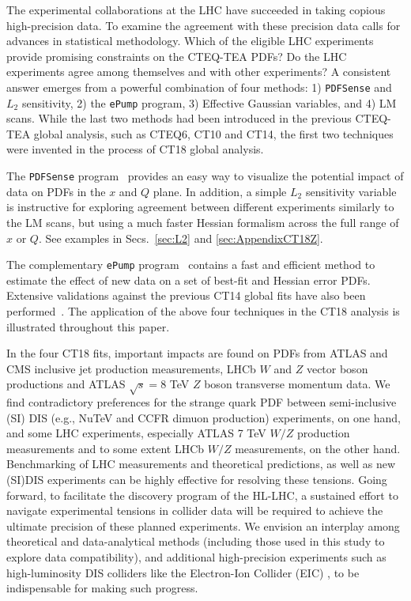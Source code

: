 The experimental collaborations at the LHC have succeeded in taking copious high-precision data. To examine
the agreement with these precision data calls for advances in statistical methodology. 
Which of the eligible LHC experiments provide promising constraints on the CTEQ-TEA PDFs?
Do the LHC experiments agree among themselves and with other experiments?
A consistent answer emerges from a powerful combination of four methods:
1) \texttt{PDFSense} and $L_2$ sensitivity,
2) the \texttt{ePump} program, 
3) Effective Gaussian variables,
and 4) LM scans. 
While the last two methods had been introduced in the previous CTEQ-TEA global analysis, such as CTEQ6, CT10 and CT14, the first two techniques were invented in the process of CT18 global analysis. 

The \texttt{PDFSense} program~\cite{Wang:2018heo} provides an easy way to visualize the potential impact of data on PDFs in the $x$ and $Q$ plane. In addition, a simple $L_2$ sensitivity variable \cite{Hobbs:2019gob} is instructive for exploring agreement between different experiments similarly to the LM scans, but using a much faster Hessian formalism across the full range of $x$ or $Q$. See examples in Secs.~\ref{sec:L2} and \ref{sec:AppendixCT18Z}. 

The complementary \texttt{ePump} program~\cite{Schmidt:2018hvu} contains a fast and efficient method to estimate the effect of new data on a set of best-fit and Hessian error PDFs. Extensive validations against the previous CT14 global fits have also been performed~\cite{Hou:2019gfw}.
The application of the above four techniques in the CT18 analysis is illustrated throughout this paper. 

In the four CT18 fits, important impacts are found on PDFs from ATLAS and CMS inclusive jet production measurements, LHCb $W$ and $Z$ vector boson productions and ATLAS $\sqrt{s}=8$ TeV $Z$ boson transverse momentum data. We find contradictory preferences for the strange quark PDF between semi-inclusive (SI) DIS (e.g., NuTeV and CCFR dimuon production) experiments, on one hand, and some LHC experiments, especially ATLAS 7 TeV $W/Z$ production measurements and to some extent LHCb $W/Z$ measurements, on the other hand. Benchmarking of LHC measurements and theoretical predictions, as well as new (SI)DIS experiments can be highly effective for resolving these tensions. Going forward, to facilitate the discovery program of the HL-LHC, a sustained effort to navigate experimental tensions in collider data will be required to achieve the ultimate precision of these planned experiments.  We envision an interplay among theoretical and data-analytical methods (including those
used in this study to explore data compatibility), and additional high-precision experiments such as high-luminosity DIS colliders like the Electron-Ion Collider (EIC) \cite{Accardi:2012qut}, to be indispensable for making such progress.

